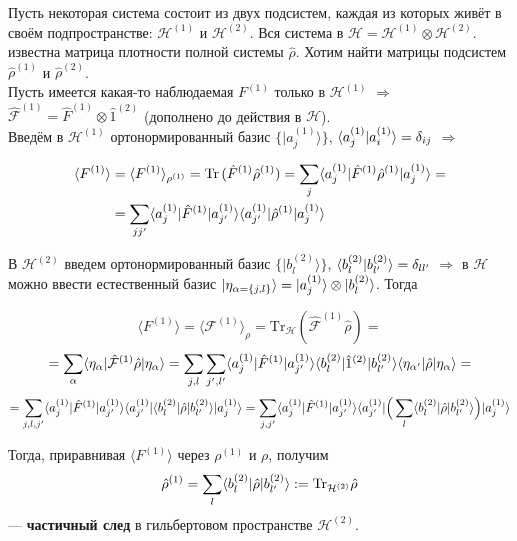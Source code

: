 Пусть некоторая система состоит из двух подсистем, каждая из которых живёт в своём подпространстве: $\mathcal{H}^{(1)}$ и $\mathcal{H}^{(2)}$. Вся система в $\mathcal{H} = \mathcal{H}^{(1)} \otimes \mathcal{H}^{(2)}$. известна матрица плотности полной системы $\hat{\rho}$. Хотим найти матрицы подсистем $\hat{\rho}^{(1)}$ и $\hat{\rho}^{(2)}$.\\

Пусть имеется какая-то наблюдаемая $F^{(1)}$ только в $\mathcal{H}^{(1)}$ $\Rightarrow$
$\hat{\mathcal{F}}^{(1)} = \hat{F}^{(1)} \otimes \hat{1}^{(2)}$ (дополнено до действия в $\mathcal{H}$).\\

Введём в $\mathcal{H}^{(1)}$ ортонормированный базис $\{|a_j^{(1)}\rangle\}$, $\langle a_j^{(1)} | a_{i}^{(1)} \rangle = \delta_{ij}$ $\Rightarrow$

\begin{align*}
	\langle F^{(1)}\rangle
	&= \langle F^{(1)}\rangle_{\rho^{(1)}} = \mathrm{Tr}\,(\hat{F}^{(1)}\hat{\rho}^{(1)})
	= \sum_j \langle a_j^{(1)} | \hat{F}^{(1)}\hat{\rho}^{(1)} | a_j^{(1)} \rangle = \\
	&= \sum\limits_{jj'}\langle a_j^{(1)} | \hat{F}^{(1)} | a_{j'}^{(1)} \rangle\langle a_{j'}^{(1)} | \hat{\rho}^{(1)} | a_{j}^{(1)} \rangle
\end{align*}

В $\mathcal{H}^{(2)}$ введем ортонормированный базис $\{|b_l^{(2)}\rangle\}$, $\langle b_l^{(2)} | b_{l'}^{(2)} \rangle = \delta_{ll'}$ $\Rightarrow$ в $\mathcal{H}$ можно ввести естественный базис $| \eta_{\alpha=\{j, l\}} \rangle = | a_j^{(1)} \rangle\otimes| b_l^{(2)} \rangle$. Тогда

\[
	\langle F^{(1)}\rangle = \langle \mathcal{F}^{(1)} \rangle_{\rho} = \mathrm{Tr}_{\mathcal{H}}(\hat{\mathcal{F}}^{(1)}\hat{\rho}) =
\]
\[
 =  \sum_\alpha \langle \eta_\alpha | \hat{\mathcal{F}}^{(1)}\hat{\rho} | \eta_\alpha \rangle = \sum\limits_{j, l}\sum\limits_{j', l' }\langle a_j^{(1)} | \hat{F}^{(1)} | a_{j'}^{(1)} \rangle\langle b_{l}^{(2)} | \hat{1}^{(2)} | b_{l'}^{(2)} \rangle\langle \eta_{\alpha'} | \hat{\rho} | \eta_\alpha \rangle = 
\]
\[
= \sum\limits_{j, l, j'}\langle a_j^{(1)} | \hat{F}^{(1)} | a_{j'}^{(1)} \rangle \langle a_{j'}^{(1)} |\langle b_l^{(2)} | \hat{\rho} | b_{l'}^{(2)} \rangle| a_j^{(1)} \rangle = \sum\limits_{j, j'}\langle a_j^{(1)} | \hat{F}^{(1)} | a_{j'}^{(1)} \rangle \langle a_{j'}^{(1)} |\Big(\sum_l\langle b_l^{(2)} | \hat{\rho} | b_{l'}^{(2)} \rangle\Big)| a_j^{(1)} \rangle
\]

Тогда, приравнивая $\langle F^{(1)}\rangle$ через $\rho^{(1)}$ и $\rho$, получим
\[
\hat{\rho}^{(1)} = \sum_l \langle b_l^{(2)} | \hat{\rho} | b_{l'}^{(2)} \rangle := \mathrm{Tr}_{\mathcal{H}^{(2)}}\hat{\rho}
\]
--- \textbf{частичный след} в гильбертовом пространстве $\mathcal{H}^{(2)}$.\\


